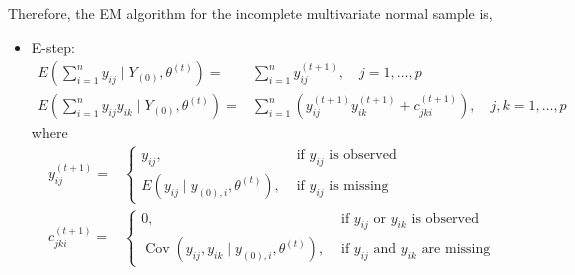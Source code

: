 \begin{example}
	Therefore, the EM algorithm for the incomplete multivariate normal sample is,
	\begin{itemize}
		\item E-step:
		      \begin{equation}
			      \begin{aligned}
				      E\left(\sum_{i=1}^{n} y_{i j} \mid Y_{(0)}, \theta^{(t)}\right)=         & \sum_{i=1}^{n} y_{i j}^{(t+1)}, \quad j=1, \ldots, p                                                  \\
				      E\left(\sum_{i=1}^{n} y_{i j} y_{i k} \mid Y_{(0)}, \theta^{(t)}\right)= & \sum_{i=1}^{n}\left(y_{i j}^{(t+1)} y_{i k}^{(t+1)}+c_{j k i}^{(t+1)}\right), \quad j, k=1, \ldots, p
			      \end{aligned}
		      \end{equation}
		      where
		      \begin{equation}
			      \begin{aligned}
				      y_{i j}^{(t+1)}=   & \left\{\begin{array}{ll}
					                                  y_{i j},                                             & \text { if } y_{i j} \text { is observed} \\
					                                  E\left(y_{i j} \mid y_{(0), i}, \theta^{(t)}\right), & \text { if } y_{i j} \text { is missing}
				                                  \end{array}\right.                                                                          \\
				      c_{j k i}^{(t+1)}= & \left\{\begin{array}{ll}
					                                  0,                                                                             & \text { if } y_{i j} \text { or } y_{i k} \text { is observed}  \\
					                                  \operatorname{Cov}\left(y_{i j}, y_{i k} \mid y_{(0), i}, \theta^{(t)}\right), & \text { if } y_{i j} \text { and } y_{i k} \text { are missing}
				                                  \end{array}\right.
			      \end{aligned}
		      \end{equation}


\end{itemize}
\end{example}
